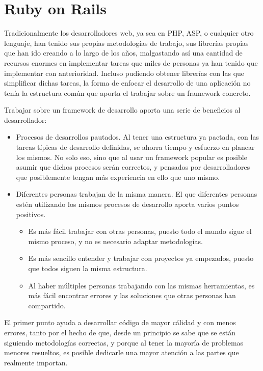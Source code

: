 \section{Ruby on Rails} %
\label{sec:ruby_on_rails}

Tradicionalmente los desarrolladores web, ya sea en PHP, ASP, o cualquier otro lenguaje, han tenido sus propias metodologías de trabajo, sus librerías propias que han ido creando a lo largo de los años, malgastando así una cantidad de recursos enormes en implementar tareas que miles de personas ya han tenido que implementar con anterioridad. Incluso pudiendo obtener librerías con las que simplificar dichas tareas, la forma de enfocar el desarrollo de una aplicación no tenía la estructura común que aporta el trabajar sobre un framework concreto.

Trabajar sobre un framework de desarrollo aporta una serie de beneficios al desarrollador:

\begin{itemize}
  \item Procesos de desarrollos pautados. Al tener una estructura ya pactada, con las tareas típicas de desarrollo definidas, se ahorra tiempo y esfuerzo en planear los mismos. No solo eso, sino que al usar un framework popular es posible asumir que dichos procesos serán correctos, y pensados por desarrolladores que posiblemente tengan más experiencia en ello que uno mismo.
  \item Diferentes personas trabajan de la misma manera. El que diferentes personas estén utilizando los mismos procesos de desarrollo aporta varios puntos positivos.
  \begin{itemize}
    \item Es más fácil trabajar con otras personas, puesto todo el mundo sigue el mismo proceso, y no es necesario adaptar metodologías.
    \item Es más sencillo entender y trabajar con proyectos ya empezados, puesto que todos siguen la misma estructura.
    \item Al haber múltiples personas trabajando con las mismas herramientas, es más fácil encontrar errores y las soluciones que otras personas han compartido.
  \end{itemize}
\end{itemize}

El primer punto ayuda a desarrollar código de mayor cálidad y con menos errores, tanto por el hecho de que, desde un principio se sabe que se están siguiendo metodologías correctas, y porque al tener la mayoría de problemas menores resueltos, es posible dedicarle una mayor atención a las partes que realmente importan.


